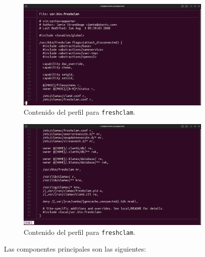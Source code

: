 \documentclass{article}
\begin{document}
\begin{figure}[H]
    \centering
    \includegraphics[width=0.85\textwidth]{imagenes/Captura desde 2022-10-18 16-13-59.png}
    \caption{Contenido del perfil para \texttt{freshclam}.}
\end{figure}

\begin{figure}[H]
    \centering
    \includegraphics[width=0.85\textwidth]{imagenes/Captura desde 2022-10-18 16-14-08.png}
    \caption{Contenido del perfil para \texttt{freshclam}.}
\end{figure}

Las componentes principales son las siguientes:

\end{document}
